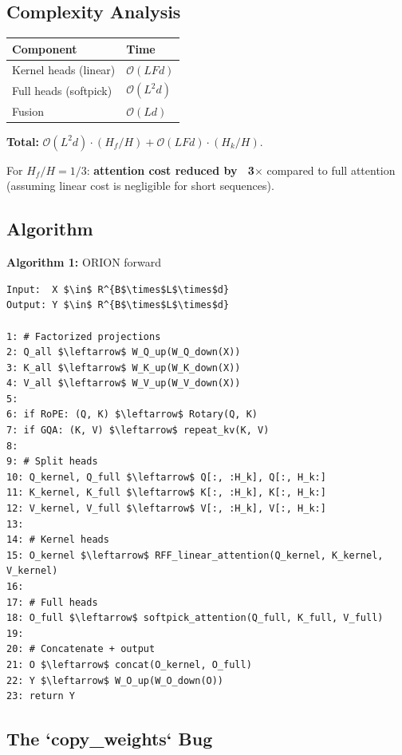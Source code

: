 \subsection{Complexity Analysis}

\begin{table}[H]
\centering
\small
\begin{tabular}{ll}
\toprule
\textbf{Component} & \textbf{Time} \\
\midrule
Kernel heads (linear) & $\mathcal{O}(L F d)$ \\
Full heads (softpick) & $\mathcal{O}(L^2 d)$ \\
Fusion & $\mathcal{O}(L d)$ \\
\bottomrule
\end{tabular}
\end{table}

\textbf{Total:} $\mathcal{O}(L^2 d) \cdot (H_f / H) + \mathcal{O}(L F d) \cdot (H_k / H)$.

For $H_f / H = 1/3$: \textbf{attention cost reduced by ~3$\times$} compared to full 
attention (assuming linear cost is negligible for short sequences).

\subsection{Algorithm}

\textbf{Algorithm 1:} ORION forward
\begin{lstlisting}
Input:  X $\in$ R^{B$\times$L$\times$d}
Output: Y $\in$ R^{B$\times$L$\times$d}

1: # Factorized projections
2: Q_all $\leftarrow$ W_Q_up(W_Q_down(X))
3: K_all $\leftarrow$ W_K_up(W_K_down(X))
4: V_all $\leftarrow$ W_V_up(W_V_down(X))
5:
6: if RoPE: (Q, K) $\leftarrow$ Rotary(Q, K)
7: if GQA: (K, V) $\leftarrow$ repeat_kv(K, V)
8:
9: # Split heads
10: Q_kernel, Q_full $\leftarrow$ Q[:, :H_k], Q[:, H_k:]
11: K_kernel, K_full $\leftarrow$ K[:, :H_k], K[:, H_k:]
12: V_kernel, V_full $\leftarrow$ V[:, :H_k], V[:, H_k:]
13:
14: # Kernel heads
15: O_kernel $\leftarrow$ RFF_linear_attention(Q_kernel, K_kernel, V_kernel)
16:
17: # Full heads
18: O_full $\leftarrow$ softpick_attention(Q_full, K_full, V_full)
19:
20: # Concatenate + output
21: O $\leftarrow$ concat(O_kernel, O_full)
22: Y $\leftarrow$ W_O_up(W_O_down(O))
23: return Y
\end{lstlisting}

\subsection{The `copy\_weights` Bug}

